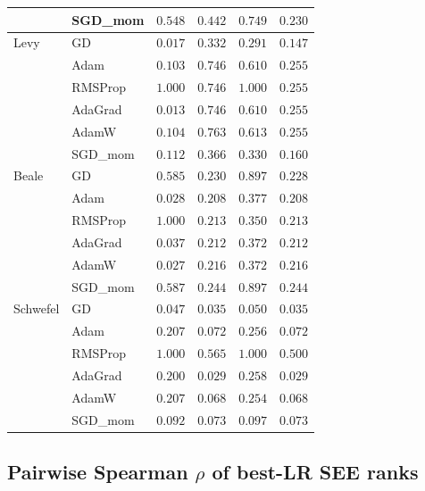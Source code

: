 \documentclass[11pt]{article}
\begin{document}
\begin{center}
\begin{tabular}{llcccc}
           & SGD\_mom& $0.548$ & $0.442$ & $0.749$ & $0.230$ \\
\midrule
Levy       & GD      & $0.017$ & $0.332$ & $0.291$ & $0.147$ \\
           & Adam    & $0.103$ & $0.746$ & $0.610$ & $0.255$ \\
           & RMSProp & $1.000$ & $0.746$ & $1.000$ & $0.255$ \\
           & AdaGrad & $0.013$ & $0.746$ & $0.610$ & $0.255$ \\
           & AdamW   & $0.104$ & $0.763$ & $0.613$ & $0.255$ \\
           & SGD\_mom& $0.112$ & $0.366$ & $0.330$ & $0.160$ \\
\midrule
Beale      & GD      & $0.585$ & $0.230$ & $0.897$ & $0.228$ \\
           & Adam    & $0.028$ & $0.208$ & $0.377$ & $0.208$ \\
           & RMSProp & $1.000$ & $0.213$ & $0.350$ & $0.213$ \\
           & AdaGrad & $0.037$ & $0.212$ & $0.372$ & $0.212$ \\
           & AdamW   & $0.027$ & $0.216$ & $0.372$ & $0.216$ \\
           & SGD\_mom& $0.587$ & $0.244$ & $0.897$ & $0.244$ \\
\midrule
Schwefel   & GD      & $0.047$ & $0.035$ & $0.050$ & $0.035$ \\
           & Adam    & $0.207$ & $0.072$ & $0.256$ & $0.072$ \\
           & RMSProp & $1.000$ & $0.565$ & $1.000$ & $0.500$ \\
           & AdaGrad & $0.200$ & $0.029$ & $0.258$ & $0.029$ \\
           & AdamW   & $0.207$ & $0.068$ & $0.254$ & $0.068$ \\
           & SGD\_mom& $0.092$ & $0.073$ & $0.097$ & $0.073$ \\
\bottomrule
\end{tabular}
\end{center}

\subsection{Pairwise Spearman $\rho$ of best-LR SEE ranks}
\end{document}
